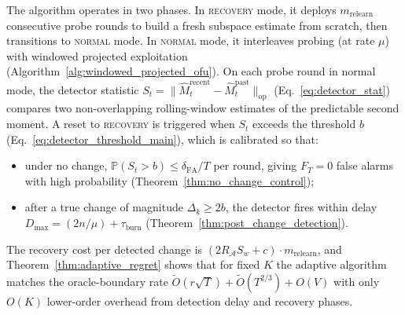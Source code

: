 \documentclass{article}
\newcommand{\Prob}{\mathbb{P}}
\newcommand{\op}{\mathrm{op}}
\newcommand{\cA}{\mathcal{A}}
\begin{document}
  The algorithm operates in two phases.  In \textsc{recovery} mode, it deploys
  $m_{\mathrm{relearn}}$ consecutive probe rounds to build a fresh subspace
  estimate from scratch, then transitions to \textsc{normal} mode.  In
  \textsc{normal} mode, it interleaves probing (at rate $\mu$) with windowed
  projected exploitation (Algorithm~\ref{alg:windowed_projected_ofu}).
  On each probe round in normal mode, the detector statistic
  $S_t = \|\widehat M_t^{\mathrm{recent}} - \widehat M_t^{\mathrm{past}}\|_{\op}$
  (Eq.~\eqref{eq:detector_stat}) compares two non-overlapping rolling-window
  estimates of the predictable second moment.  A reset to \textsc{recovery} is
  triggered when $S_t$ exceeds the threshold $b$
  (Eq.~\eqref{eq:detector_threshold_main}), which is calibrated so that:
  \begin{itemize}[nosep,leftmargin=1.5em]
    \item under no change, $\Prob(S_t > b) \le \delta_{\mathrm{FA}}/T$
          per round, giving $F_T = 0$ false alarms with high probability
          (Theorem~\ref{thm:no_change_control});
    \item after a true change of magnitude $\Delta_k \ge 2b$, the detector
          fires within delay $D_{\max} = (2n/\mu) + \tau_{\mathrm{burn}}$
          (Theorem~\ref{thm:post_change_detection}).
  \end{itemize}
  The recovery cost per detected change is $(2R_{\cA} S_w + c) \cdot m_{\mathrm{relearn}}$,
  and Theorem~\ref{thm:adaptive_regret} shows that for fixed $K$ the adaptive
  algorithm matches the oracle-boundary rate
  $\widetilde O(r\sqrt{T}) + \widetilde O(T^{2/3}) + O(V)$
  with only $O(K)$ lower-order overhead from detection delay and recovery phases.
\end{document}
